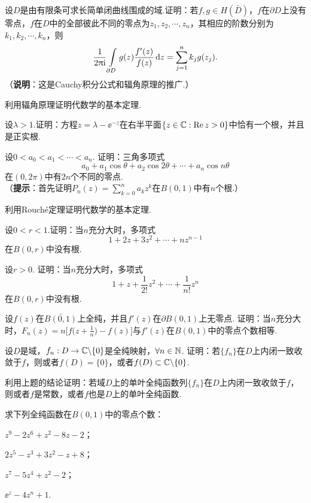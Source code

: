 \begin{xiti}\hypertarget{xiti4.4}{}
  \item 设$D$是由有限条可求长简单闭曲线围成的域.证明：若$f,g\in H(\bar D)$，$f$在$\partial D$上没有零点，$f$在$D$中的全部彼此不同的零点为$z_1,z_2,\cdots,z_n$，其相应的阶数分别为$k_1,k_2,\cdots,k_n$，则
      \[
        \frac1{2\uppi\mathrm i}\int\limits_{\partial D}g(z)\frac{f'(z)}{f(z)}\mathop{}\!\mathrm dz=\sum_{j=1}^nk_jg(z_j).
      \]
     （\textbf{说明}：这是Cauchy积分公式和辐角原理的推广.）
  \item 利用辐角原理证明代数学的基本定理.
  \item 设$\lambda>1$.证明：方程$z=\lambda-\ee^{-z}$在右半平面$\{z\in\mathbb C:\operatorname{Re} z>0\}$中恰有一个根，并且是正实根.
  \item 设$0<a_0<a_1<\cdots<a_n$. 证明：三角多项式
      \[
       a_0 + a_1 \cos\theta + a_2\cos2\theta + \cdots + a_n\cos n\theta
      \]
      在$(0,2\pi)$中有$2n$个不同的零点.\\
      （\textbf{提示}：首先证明$P_n(z)=\sum_{k=0}^n a_kz^k$在$B(0,1)$中有$n$个根.）
  \item 利用Rouch\'e定理证明代数学的基本定理.
  \item 设$0<r<1$.证明：当$n$充分大时，多项式
      \[
        1 + 2z + 3z^2 + \cdots + nz^{n-1}
      \]
      在$B(0,r)$中没有根.
  \item 设$r>0$. 证明：当$n$充分大时，多项式
      \[
        1 + z + \frac1{2!}z^2 + \cdots + \frac1{n!}z^n
      \]
      在$B(0,r)$中没有根.
  \item 设$f(z)$在$\bar{B(0,1)}$上全纯，并且$f'(z)$在$\partial B(0,1)$上无零点. 证明：当$n$充分大时，$F_n(z)=n\bigg[f\bigg(z+\frac1n\bigg)-f(z)\bigg]$与$f'(z)$在$B(0,1)$中的零点个数相等.
  \item 设$D$是域，$f_n:D\to\mathbb C\backslash\{0\}$是全纯映射，$\forall n\in \mathbb N$. 证明：若$\{f_n\}$在$D$上内闭一致收敛于$f$，则或者$f(D)=\{0\}$，或者$f(D)\subset\mathbb C\backslash\{0\}$.
  \item 利用上题的结论证明：若域$D$上的单叶全纯函数列$\{f_n\}$在$D$上内闭一致收敛于$f$，则或者$f$是常数，或者$f$也是$D$上的单叶全纯函数.
  \item 求下列全纯函数在$B(0,1)$中的零点个数：
    \begin{enuma}
      \item $z^9-2z^6+z^2-8z-2$；
      \item $2z^5-z^3+3z^2-z+8$；
      \item $z^7-5z^4+z^2-2$；
      \item $\ee^z-4z^n+1$.
    \end{enuma}

\end{xiti}
